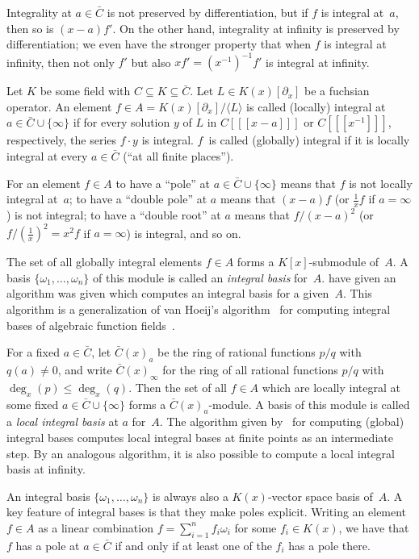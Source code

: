 \documentclass[final,1p,times,authoryear]{elsarticle}
\def\<#1>{\langle#1\rangle}
\begin{document}
Integrality at $a\in\bar C$ is not preserved by differentiation,
but if $f$ is integral at~$a$, then so is $(x-a)f'$. On the other hand,
integrality at infinity is preserved by differentiation; we even have the
stronger property that when $f$ is integral at infinity, then not only $f'$
but also $xf'=(x^{-1})^{-1}f'$ is integral at infinity.

Let $K$ be some field with $C\subseteq K\subseteq\bar C$.
Let $L\in K(x)[\partial_x]$ be a fuchsian operator. An element $f\in A=K(x)[\partial_x]/\<L>$
is called (locally) integral at $a\in\bar C\cup\{\infty\}$ if for every solution $y$
of $L$ in $C[[[x-a]]]$ or $C[[[x^{-1}]]]$, respectively, the series $f\cdot y$ is
integral. $f$~is called (globally) integral if it is locally integral at every
$a\in\bar C$ (``at all finite places'').

For an element $f\in A$ to have a ``pole'' at $a\in\bar C\cup\{\infty\}$ means
that $f$ is not locally integral at~$a$; to have a ``double pole'' at $a$ means
that $(x-a)f$ (or $\frac1xf$ if $a=\infty$) is not integral; to have a ``double
root'' at $a$ means that $f/(x-a)^2$ (or $f/(\frac1x)^2=x^2f$ if $a=\infty$) is integral,
and so on.

The set of all globally integral elements $f\in A$ forms a $K[x]$-submodule of~$A$.
A basis $\{\omega_1,\dots,\omega_n\}$ of this module is called an \emph{integral basis}
for~$A$. \cite{kauers15b} have given an algorithm was given which computes an integral basis
for a given~$A$. This algorithm is a generalization of van Hoeij's
algorithm~\citep{vanHoeij94} for computing integral bases of algebraic function
fields~\citep{trager84,Rybowicz:1991:ACI:120694.120715}.

For a fixed $a\in\bar C$, let $\bar C(x)_a$ be the ring of rational functions $p/q$
with $q(a)\neq0$, and write $\bar C(x)_\infty$ for the ring of all
rational functions $p/q$ with $\deg_x(p)\leq\deg_x(q)$.
Then the set of all $f\in A$ which are locally integral at some
fixed $a\in\bar C\cup\{\infty\}$ forms a $\bar C(x)_a$-module. A basis of this module is
called a \emph{local integral basis} at $a$ for~$A$. The algorithm given by~\cite{kauers15b}
for computing (global) integral bases computes local integral bases at finite
points as an intermediate step. By an analogous algorithm, it is also possible
to compute a local integral basis at infinity.

An integral basis $\{\omega_1,\dots,\omega_n\}$ is always also a $K(x)$-vector space
basis of~$A$. A key feature of integral bases is that they make poles explicit. Writing
an element $f\in A$ as a linear combination $f=\sum_{i=1}^n f_i\omega_i$ for some
$f_i\in K(x)$, we have that $f$ has a pole at $a\in\bar C$ if and only if at least one
of the $f_i$ has a pole there.
\end{document}
